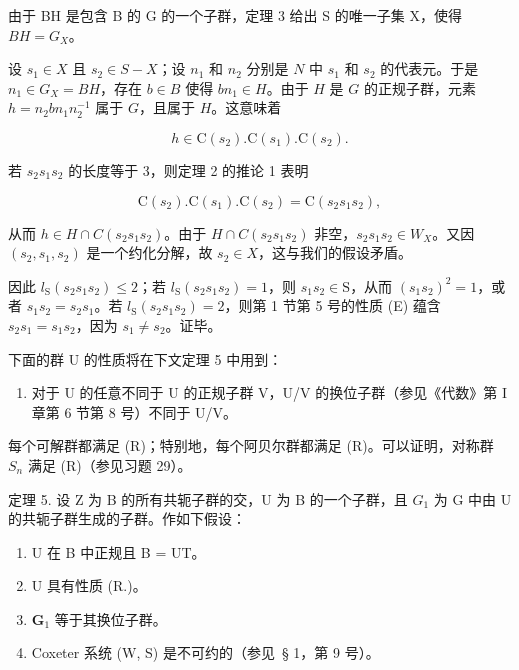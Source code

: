由于 BH 是包含 B 的 G 的一个子群，定理 3 给出 S 的唯一子集 X，使得 \(BH = G_{X}\)。

设 \(s_1 \in X\) 且 \(s_2 \in S - X\)；设 \(n_1\) 和 \(n_2\) 分别是 \(N\) 中 \(s_1\) 和 \(s_2\) 的代表元。于是 \(n_1 \in G_X = BH\)，存在 \(b \in B\) 使得 \(bn_1 \in H\)。由于 \(H\) 是 \(G\) 的正规子群，元素 \(h = n_2bn_1n_2^{-1}\) 属于 \(G\)，且属于 \(H\)。这意味着

\[
h \in \mathrm{C} (s _ {2}). \mathrm{C} (s _ {1}). \mathrm{C} (s _ {2}).
\]

若 \(s_2s_1s_2\) 的长度等于 3，则定理 2 的推论 1 表明

\[
\mathrm{C} (s _ {2}). \mathrm{C} (s _ {1}). \mathrm{C} (s _ {2}) = \mathrm{C} (s _ {2} s _ {1} s _ {2}),
\]

从而 \(h \in H \cap C(s_{2}s_{1}s_{2})\)。由于 \(H \cap C(s_{2}s_{1}s_{2})\) 非空，\(s_{2}s_{1}s_{2} \in W_{X}\)。又因 \((s_{2}, s_{1}, s_{2})\) 是一个约化分解，故 \(s_{2} \in X\)，这与我们的假设矛盾。

因此 \(l_{\mathrm{S}}(s_2s_1s_2) \leqslant 2\)；若 \(l_{\mathrm{S}}(s_2s_1s_2) = 1\)，则 \(s_1s_2 \in \mathrm{S}\)，从而 \((s_1s_2)^2 = 1\)，或者 \(s_1s_2 = s_2s_1\)。若 \(l_{\mathrm{S}}(s_2s_1s_2) = 2\)，则第 1 节第 5 号的性质 (E) 蕴含 \(s_2s_1 = s_1s_2\)，因为 \(s_1 \neq s_2\)。证毕。

下面的群 U 的性质将在下文定理 5 中用到：

\begin{enumerate}
\def\labelenumi{(\Alph{enumi})}
\setcounter{enumi}{17}
\tightlist
\item
  对于 U 的任意不同于 U 的正规子群 V，U/V 的换位子群（参见《代数》第 I 章第 6 节第 8 号）不同于 U/V。
\end{enumerate}

每个可解群都满足 (R)；特别地，每个阿贝尔群都满足 (R)。可以证明，对称群 \(S_{n}\) 满足 (R)（参见习题 29）。

定理 5. 设 Z 为 B 的所有共轭子群的交，U 为 B 的一个子群，且 \(G_{1}\) 为 G 中由 U 的共轭子群生成的子群。作如下假设：

\begin{enumerate}
\def\labelenumi{\arabic{enumi})}
\item
  U 在 B 中正规且 B = UT。
\item
  U 具有性质 (R.)。
\item
  \(\mathbf{G}_1\) 等于其换位子群。
\item
  Coxeter 系统 (W, S) 是不可约的（参见~§ 1，第 9 号）。
\end{enumerate}

